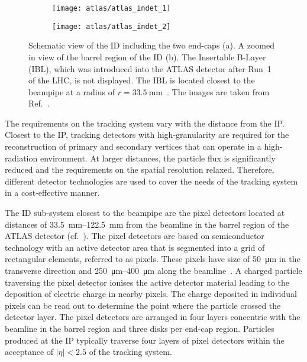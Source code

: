 \begin{figure}[htbp]

  \begin{subfigure}[b]{0.55\textwidth}
    \texttt{[image: atlas/atlas\_indet\_1]}%
    \subcaption{}
  \end{subfigure}\hfill%
  \begin{subfigure}[b]{0.45\textwidth}
    \texttt{[image: atlas/atlas\_indet\_2]}%
    \subcaption{}%
    \label{fig:indet_barrel}
  \end{subfigure}

  \caption[Schematic view of the Inner Detector of the ATLAS
  experiment.]{Schematic view of the ID including the two end-caps (a). A zoomed
    in view of the barrel region of the ID (b). The Insertable B-Layer (IBL),
    which was introduced into the ATLAS detector after Run~1 of the LHC, is not
    displayed. The IBL is located closest to the beampipe at a radius of
    $r = \SI{33.5}{\milli\metre}$~\cite{ATLAS-TDR-19,PIX-2018-001}. The images
    are taken from Ref.~\cite{PERF-2007-01}.}%
  \label{fig:atlas_inner_detector}
\end{figure}

The requirements on the tracking system vary with the distance from the IP.
Closest to the IP, tracking detectors with high-granularity are required for the
reconstruction of primary and secondary vertices that can operate in a
high-radiation environment. At larger distances, the particle flux is
significantly reduced and the requirements on the spatial resolution relaxed.
Therefore, different detector technologies are used to cover the needs of the
tracking system in a cost-effective manner.

The ID sub-system closest to the beampipe are the pixel detectors located at
distances of \SIrange{33.5}{122.5}{\milli\metre} from the beamline in the barrel
region of the ATLAS detector (cf.\ ). The pixel
detectors are based on semiconductor technology with an active detector area
that is segmented into a grid of rectangular elements, referred to as
pixels. These pixels have size of \SI{50}{\micro\metre} in the transverse
direction and \SIrange{250}{400}{\micro\metre} along the
beamline~\cite{PERF-2007-01,PIX-2018-001}. A charged particle traversing the
pixel detector ionises the active detector material leading to the deposition of
electric charge in nearby pixels. The charge deposited in individual pixels can
be read out to determine the point where the particle crossed the detector
layer. The pixel detectors are arranged in four layers concentric with the
beamline in the barrel region and three disks per end-cap region. Particles
produced at the IP typically traverse four layers of pixel detectors within the
acceptance of $|\eta| < 2.5$ of the tracking system.

